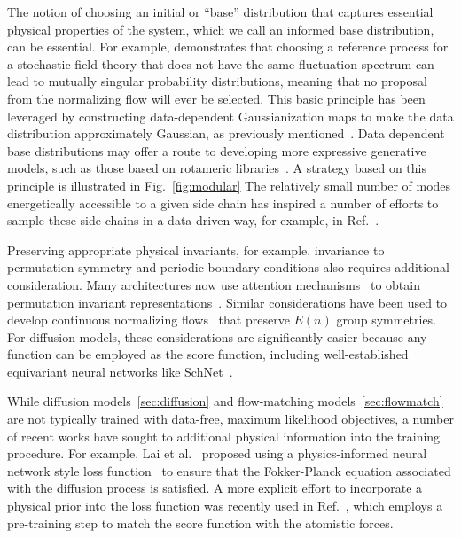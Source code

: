 \documentclass[11pt]{article}
\begin{document}
The notion of choosing an initial or ``base'' distribution that captures essential physical properties of the system, which we call an informed base distribution, can be essential. 
For example, \cite{gabrie_adaptive_2022} demonstrates that choosing a reference process for a stochastic field theory that does not have the same fluctuation spectrum can lead to mutually singular probability distributions, meaning that no proposal from the normalizing flow will ever be selected.
This basic principle has been leveraged by constructing data-dependent Gaussianization maps to make the data distribution approximately Gaussian, as previously mentioned~\cite{noe_boltzmann_2019}.
Data dependent base distributions may offer a route to developing more expressive generative models, such as those based on rotameric libraries~\cite{dunbrack_jr_bayesian_1997, dunbrack_rotamer_2002}.
A strategy based on this principle is illustrated in Fig.~\ref{fig:modular}
The relatively small number of modes energetically accessible to a given side chain has inspired a number of efforts to sample these side chains in a data driven way, for example, in Ref.~\cite{jumper_rapid_2017}.

Preserving appropriate physical invariants, for example, invariance to permutation symmetry and periodic boundary conditions also requires additional consideration.
Many architectures now use attention mechanisms~\cite{vaswani_attention_2017} to obtain permutation invariant representations~\cite{wirnsberger_targeted_2020}.
Similar considerations have been used to develop continuous normalizing flows~\cite{satorras_en_2021-1} that preserve $E(n)$ group symmetries. 
For diffusion models, these considerations are significantly easier because any function can be employed as the score function, including well-established equivariant neural networks like SchNet~\cite{schutt_schnet_2018}. 

While diffusion models~\ref{sec:diffusion} and flow-matching models~\ref{sec:flowmatch} are not typically trained with data-free, maximum likelihood objectives, a number of recent works have sought to additional physical information into the training procedure.
For example, Lai et al.~\cite{lai_fp-diffusion_2023} proposed using a physics-informed neural network style loss function~\cite{karniadakis_physics-informed_2021} to ensure that the Fokker-Planck equation associated with the diffusion process is satisfied.
A more explicit effort to incorporate a physical prior into the loss function was recently used in Ref.~\cite{zheng_towards_2023}, which employs a pre-training step to match the score function with the atomistic forces.
\end{document}
